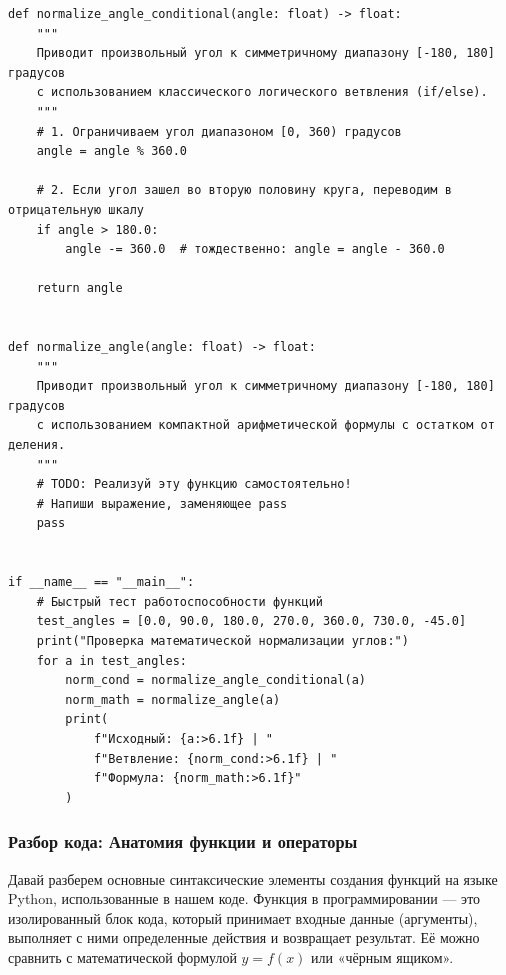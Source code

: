 \begin{listing}[H]
	\caption{Вспомогательные функции в файле utils.py}
	\label{lst:utils_code}
	\begin{verbatim}
def normalize_angle_conditional(angle: float) -> float:
    """
    Приводит произвольный угол к симметричному диапазону [-180, 180] градусов
    с использованием классического логического ветвления (if/else).
    """
    # 1. Ограничиваем угол диапазоном [0, 360) градусов
    angle = angle % 360.0
    
    # 2. Если угол зашел во вторую половину круга, переводим в отрицательную шкалу
    if angle > 180.0:
        angle -= 360.0  # тождественно: angle = angle - 360.0
        
    return angle


def normalize_angle(angle: float) -> float:
    """
    Приводит произвольный угол к симметричному диапазону [-180, 180] градусов
    с использованием компактной арифметической формулы с остатком от деления.
    """
    # TODO: Реализуй эту функцию самостоятельно!
    # Напиши выражение, заменяющее pass
    pass


if __name__ == "__main__":
    # Быстрый тест работоспособности функций
    test_angles = [0.0, 90.0, 180.0, 270.0, 360.0, 730.0, -45.0]
    print("Проверка математической нормализации углов:")
    for a in test_angles:
        norm_cond = normalize_angle_conditional(a)
        norm_math = normalize_angle(a)
        print(
            f"Исходный: {a:>6.1f} | "
            f"Ветвление: {norm_cond:>6.1f} | "
            f"Формула: {norm_math:>6.1f}"
        )
\end{verbatim}
\end{listing}



\subsubsection{Разбор кода: Анатомия функции и операторы}

Давай разберем основные синтаксические элементы создания функций на языке Python, использованные в нашем коде. Функция в программировании --- это изолированный блок кода, который принимает входные данные (аргументы), выполняет с ними определенные действия и возвращает результат. Её можно сравнить с математической формулой $y = f(x)$ или «чёрным ящиком».

